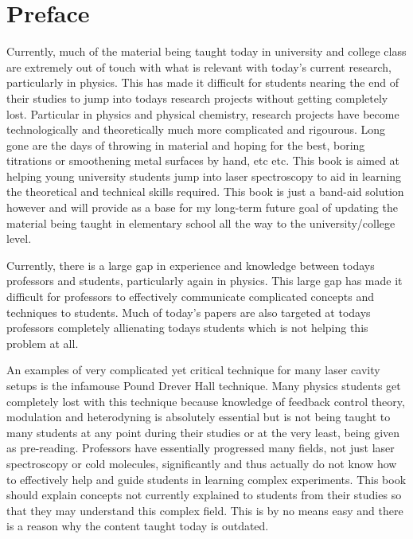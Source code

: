 \documentclass[a4paper]{book}
\begin{document}
	
	\frontmatter
		
	\chapter{Preface}

		Currently, much of the material being taught today in university and college class are extremely out of touch with what is relevant with today's current research, particularly in physics. This has made it difficult for students nearing the end of their studies to jump into todays research projects without getting completely lost. Particular in physics and physical chemistry, research projects have become technologically and theoretically much more complicated and rigourous. Long gone are the days of throwing in material and hoping for the best, boring titrations or smoothening metal surfaces by hand, etc etc. This book is aimed at helping young university students jump into laser spectroscopy to aid in learning the theoretical and technical skills required. This book is just a band-aid solution however and will provide as a base for my long-term future goal of updating the material being taught in elementary school all the way to the university/college level. 
		
		Currently, there is a large gap in experience and knowledge between todays professors and students, particularly again in physics. This large gap has made it difficult for professors to effectively communicate complicated concepts and techniques to students. Much of today's papers are also targeted at todays professors completely allienating todays students which is not helping this problem at all. 
		
		An examples of very complicated yet critical technique for many laser cavity setups is the infamouse Pound Drever Hall technique. Many physics students get completely lost with this technique because knowledge of feedback control theory, modulation and heterodyning is absolutely essential but is not being taught to many students at any point during their studies or at the very least, being given as pre-reading. Professors have essentially progressed many fields, not just laser spectroscopy or cold molecules, significantly and thus actually do not know how to effectively help and guide students in learning complex experiments. This book should explain concepts not currently explained to students from their studies so that they may understand this complex field. This is by no means easy and there is a reason why the content taught today is outdated.
		
\end{document}

